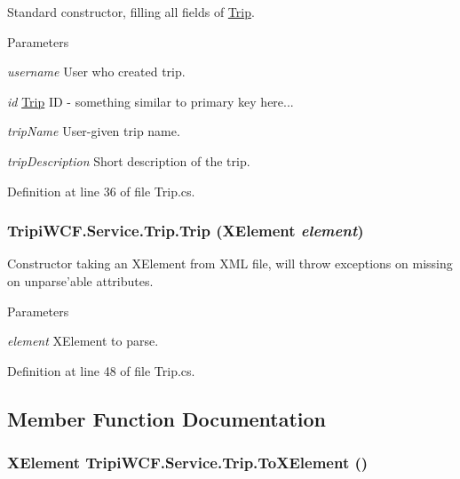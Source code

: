 Standard constructor, filling all fields of \hyperlink{class_tripi_w_c_f_1_1_service_1_1_trip}{Trip}. 
\begin{DoxyParams}{Parameters}
\item[{\em username}]User who created trip.\item[{\em id}]\hyperlink{class_tripi_w_c_f_1_1_service_1_1_trip}{Trip} ID -\/ something similar to primary key here...\item[{\em tripName}]User-\/given trip name.\item[{\em tripDescription}]Short description of the trip.\end{DoxyParams}


Definition at line 36 of file Trip.cs.\hypertarget{class_tripi_w_c_f_1_1_service_1_1_trip_a1d281550721fa997491ad341387850c5}{
\subsubsection[{Trip}]{\setlength{\rightskip}{0pt plus 5cm}TripiWCF.Service.Trip.Trip (XElement {\em element})}}
\label{class_tripi_w_c_f_1_1_service_1_1_trip_a1d281550721fa997491ad341387850c5}


Constructor taking an XElement from XML file, will throw exceptions on missing on unparse'able attributes. 
\begin{DoxyParams}{Parameters}
\item[{\em element}]XElement to parse.\end{DoxyParams}


Definition at line 48 of file Trip.cs.

\subsection{Member Function Documentation}
\hypertarget{class_tripi_w_c_f_1_1_service_1_1_trip_af533edf814444221051ce081d025f989}{
\subsubsection[{ToXElement}]{\setlength{\rightskip}{0pt plus 5cm}XElement TripiWCF.Service.Trip.ToXElement ()}}
\label{class_tripi_w_c_f_1_1_service_1_1_trip_af533edf814444221051ce081d025f989}


